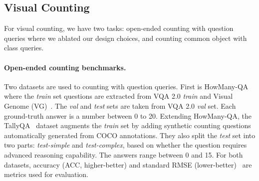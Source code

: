 \documentclass{article} \usepackage[dvipsnames,table]{xcolor}
\begin{document}
\subsection{Visual Counting\label{sec:exp:count}}

For visual counting, we have two tasks: open-ended counting with question queries where we ablated our design choices, and counting common object with class queries.

\paragraph{Open-ended counting benchmarks.} Two datasets are used to counting with question queries. First is HowMany-QA~\cite{trott2018interpretable} where the {\em train} set questions are extracted from VQA 2.0 {\em train} and Visual Genome (VG)~\cite{krishna2017visual}. The {\em val} and {\em test} sets are taken from VQA 2.0 {\em val} set. Each ground-truth answer is a number between 0 to 20. Extending HowMany-QA, the TallyQA~\cite{acharya2019tallyqa} dataset augments the {\em train} set by adding synthetic counting questions automatically generated from COCO annotations. They also split the \emph{test} set into two parts: \emph{test-simple} and \emph{test-complex}, based on whether the question requires advanced reasoning capability. The answers range between 0 and 15. For both datasets, accuracy (ACC, higher-better) and standard RMSE (lower-better)~\cite{acharya2019tallyqa} are metrics used for evaluation.
\end{document}
